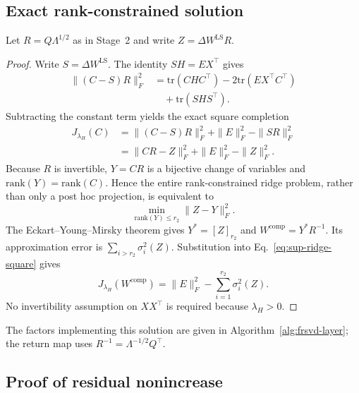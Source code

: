 \subsection{Exact rank-constrained solution}\label{sup:eigenspace-projection}

Let $R=Q\Lambda^{1/2}$ as in Stage~2 and write $Z=\Delta W^{\mathrm{LS}}R$.

\begin{proof}
Write $S=\Delta W^{\mathrm{LS}}$. The identity $SH=EX^\top$ gives
\begin{equation}
\begin{aligned}
\|(C-S)R\|_F^2
&=\mathrm{tr}(CHC^\top)-2\mathrm{tr}(EX^\top C^\top) \\
&\quad+\mathrm{tr}(SHS^\top).
\end{aligned}
\end{equation}
Subtracting the constant term yields the exact square completion
\begin{equation}
\begin{aligned}
J_{\lambda_H}(C)
&=\|(C-S)R\|_F^2+\|E\|_F^2-\|SR\|_F^2 \\
&=\|CR-Z\|_F^2+\|E\|_F^2-\|Z\|_F^2.
\end{aligned}
\label{eq:sup-ridge-square}
\end{equation}
Because $R$ is invertible, $Y=CR$ is a bijective change of variables and $\mathrm{rank}(Y)=\mathrm{rank}(C)$. Hence the entire rank-constrained ridge problem, rather than only a post hoc projection, is equivalent to
\begin{equation}
\min_{\mathrm{rank}(Y)\le r_2}\|Z-Y\|_F^2.
\end{equation}
The Eckart--Young--Mirsky theorem gives $Y^*=[Z]_{r_2}$ and $W^{\mathrm{comp}}=Y^*R^{-1}$. Its approximation error is $\sum_{i>r_2}\sigma_i^2(Z)$. Substitution into Eq.~\eqref{eq:sup-ridge-square} gives
\begin{equation}
J_{\lambda_H}(W^{\mathrm{comp}})
=\|E\|_F^2-\sum_{i=1}^{r_2}\sigma_i^2(Z).
\label{eq:ridge-optimum}
\end{equation}
No invertibility assumption on $XX^\top$ is required because $\lambda_H>0$.
\end{proof}

The factors implementing this solution are given in Algorithm~\ref{alg:frsvd-layer}; the return map uses $R^{-1}=\Lambda^{-1/2}Q^\top$.

\subsection{Proof of residual nonincrease}\label{sup:proof-lemma1}

